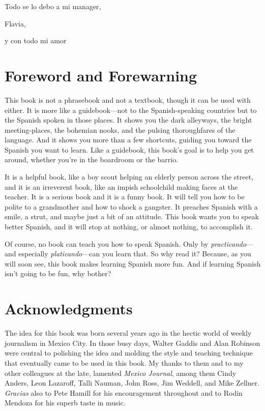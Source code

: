 \pagebreak
\thispagestyle{empty}
\vspace*{3in}

\begin{flushleft}

	Todo se lo debo a mi manager,

	Flavia,

	y con todo mi amor

\end{flushleft}

\chapter{Foreword and Forewarning}

This book is not a phrasebook and not a textbook, though
it can be used with either. It is more like a guidebook---not to the
Spanish-speaking countries but to the Spanish spoken in those places.
It shows you the dark alleyways, the bright meeting-places, the bohemian nooks, and the pulsing thoroughfares of the language. And it
shows you more than a few shortcuts, guiding you toward the Spanish
you want to learn. Like a guidebook, this book's goal is to help you get
around, whether you're in the boardroom or the barrio.

It is a helpful book, like a boy scout helping an elderly person
across the street, and it is an irreverent book, like an impish schoolchild making faces at the teacher. It is a serious book and it is a funny
book. It will tell you how to be polite to a grandmother and how to
shock a gangster. It preaches Spanish with a smile, a strut, and maybe
just a bit of an attitude. This book wants you to speak better Spanish, and it will stop at nothing, or almost nothing, to accomplish it.

Of course, no book can teach you how to speak Spanish. Only
by \emph{practicando}---and especially \emph{platicando}---can you learn that. So
why read it? Because, as you will soon see, this book makes learning
Spanish more fun. And if learning Spanish isn't going to be fun, why
bother?

\chapter{Acknowledgments}

The idea for this book was born several years ago in the hectic world of weekly journalism in Mexico City. In those busy days,
Walter Gaddis and Alan Robinson were central to polishing the idea
and molding the style and teaching technique that eventually came to
be used in this book. My thanks to them and to my other colleagues at
the late, lamented \emph{Mexico Journal}, among them Cindy Anders, Leon
Lazaroff, Talli Nauman, John Ross, Jim Weddell, and Mike Zellner.
\emph{Gracias} also to Pete Hamill for his encouragement throughout and to
Rodin Mendoza for his superb taste in music.

